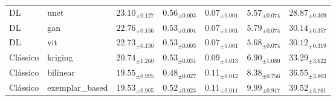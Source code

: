 \begin{table}[htbp]
{\begin{tabular}{llccccc}
DL & unet & $\mathbf{23.10_{\pm 0.127}}$ & $\mathbf{0.56_{\pm 0.003}}$ & $\mathbf{0.07_{\pm 0.001}}$ & $\mathbf{5.57_{\pm 0.074}}$ & $\mathbf{28.87_{\pm 0.309}}$ \\
DL & gan & $22.76_{\pm 0.136}$ & $0.53_{\pm 0.004}$ & $0.07_{\pm 0.001}$ & $5.79_{\pm 0.074}$ & $30.14_{\pm 0.357}$ \\
DL & vit & $22.73_{\pm 0.130}$ & $0.53_{\pm 0.003}$ & $0.07_{\pm 0.001}$ & $5.68_{\pm 0.074}$ & $30.12_{\pm 0.319}$ \\
Clássico & kriging & $\mathbf{20.74_{\pm 1.260}}$ & $\mathbf{0.53_{\pm 0.034}}$ & $\mathbf{0.09_{\pm 0.013}}$ & $\mathbf{6.90_{\pm 1.080}}$ & $\mathbf{33.29_{\pm 3.622}}$ \\
Clássico & bilinear & $19.55_{\pm 0.995}$ & $0.48_{\pm 0.027}$ & $0.11_{\pm 0.012}$ & $8.38_{\pm 0.756}$ & $36.55_{\pm 3.803}$ \\
Clássico & exemplar\_based & $19.53_{\pm 0.905}$ & $0.52_{\pm 0.023}$ & $0.11_{\pm 0.011}$ & $9.99_{\pm 0.917}$ & $39.52_{\pm 3.761}$ \\
\bottomrule
\end{tabular}
}
\end{table}
